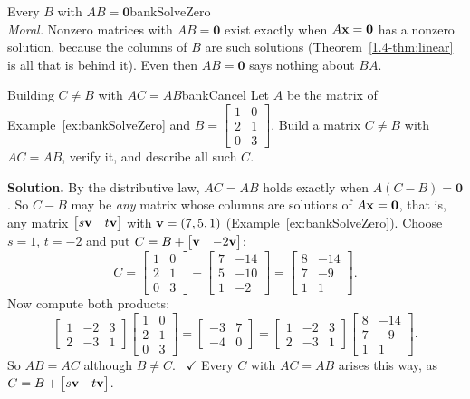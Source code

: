 \documentclass[11pt]{article}
\begin{document}
\begin{exmp}{Every $B$ with $AB=\mathbf{0}$}{bankSolveZero}
\[\]
\emph{Moral.} Nonzero matrices with $AB=\mathbf{0}$ exist exactly when $A\mathbf{x}=\mathbf{0}$ has a nonzero solution, because the columns of $B$ are such solutions (Theorem~\ref{1.4-thm:linear} is all that is behind it). Even then $AB=\mathbf{0}$ says nothing about $BA$.
\end{exmp}

\begin{exmp}{Building $C\neq B$ with $AC=AB$}{bankCancel}
Let $A$ be the matrix of Example~\ref{ex:bankSolveZero} and $B=\begin{bmatrix}1&0\\2&1\\0&3\end{bmatrix}$. Build a matrix $C\neq B$ with $AC=AB$, verify it, and describe all such $C$.

\textbf{Solution.} By the distributive law, $AC=AB$ holds exactly when $A(C-B)=\mathbf{0}$. So $C-B$ may be \emph{any} matrix whose columns are solutions of $A\mathbf{x}=\mathbf{0}$, that is, any matrix $\begin{bmatrix}s\mathbf{v}&t\mathbf{v}\end{bmatrix}$ with $\mathbf{v}=(7,5,1)$ (Example~\ref{ex:bankSolveZero}). Choose $s=1$, $t=-2$ and put $C=B+\begin{bmatrix}\mathbf{v}&-2\mathbf{v}\end{bmatrix}$:
\[
C=\begin{bmatrix}1&0\\2&1\\0&3\end{bmatrix}+\begin{bmatrix}7&-14\\5&-10\\1&-2\end{bmatrix}=\begin{bmatrix}8&-14\\7&-9\\1&1\end{bmatrix}.
\]
Now compute both products:
\[
\begin{bmatrix}1&-2&3\\2&-3&1\end{bmatrix}\begin{bmatrix}1&0\\2&1\\0&3\end{bmatrix}=\begin{bmatrix}-3&7\\-4&0\end{bmatrix}=\begin{bmatrix}1&-2&3\\2&-3&1\end{bmatrix}\begin{bmatrix}8&-14\\7&-9\\1&1\end{bmatrix}.
\]
So $AB=AC$ although $B\neq C$. \ $\checkmark$ Every $C$ with $AC=AB$ arises this way, as $C=B+\begin{bmatrix}s\mathbf{v}&t\mathbf{v}\end{bmatrix}$.


\end{exmp}
\end{document}
